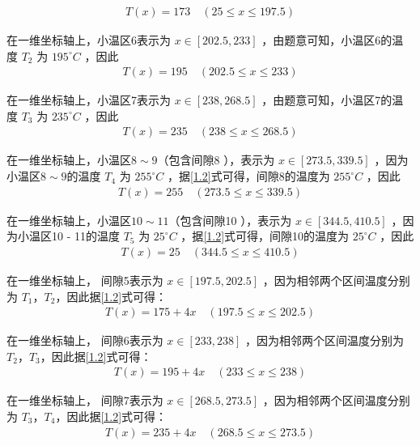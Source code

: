 \documentclass[../main.tex]{subfiles}
\begin{document}
\begin{align}\label{1.6}
T(x)=173\quad(25\leq x\leq197.5)
\end{align}
\par 在一维坐标轴上，小温区6表示为 \(x\in[202.5,233]\) ，由题意可知，小温区6的温度 \(T_{2}\) 为 \(195^{\circ}C\) ，因此
\begin{align}\label{1.7}
  T(x)=195\quad(202.5\leq x\leq233)
    \end{align}
    \par 在一维坐标轴上，小温区7表示为 \(x\in[238,268.5]\) ，由题意可知，小温区7的温度 \(T_{3}\) 为 \(235^{\circ}C\) ，因此
\begin{align}\label{1.8}
  T(x)=235\quad(238\leq x\leq268.5)
    \end{align}
\par 在一维坐标轴上，小温区$8\sim9$（包含间隙8 ），表示为 \(x\in[273.5,339.5]\) ，因为小温区$8\sim9$的温度 \(T_{4}\) 为 \(255^{\circ}C\) ，据\eqref{1.2}式可得，间隙8的温度为 \(255^{\circ}C\) ，因此
\begin{align}\label{1.9}
T(x)=255\quad(273.5\leq x\leq339.5)
    \end{align}
\par 在一维坐标轴上，小温区$10\sim11$（包含间隙10 ），表示为 \(x\in[344.5,410.5]\) ，因为小温区10 - 11的温度 \(T_{5}\) 为 \(25^{\circ}C\) ，据\eqref{1.2}式可得，间隙10的温度为 \(25^{\circ}C\) ，因此
\begin{align}\label{1.10}
    T(x)=25\quad(344.5\leq x\leq410.5)
    \end{align}
\par 在一维坐标轴上， 间隙5表示为 \(x\in[197.5,202.5]\) ，因为相邻两个区间温度分别为 \(T_1\)，\(T_2\)，因此据\eqref{1.2}式可得：
\begin{align}\label{1.11}
   T(x)=175 + 4x\quad(197.5\leq x\leq202.5)
    \end{align}
    \par 在一维坐标轴上， 间隙6表示为 \(x\in[233,238]\) ，因为相邻两个区间温度分别为 \(T_2\)，\(T_3\)，因此据\eqref{1.2}式可得：
    \begin{align}\label{1.12}
       T(x)=195 + 4x\quad(233\leq x\leq238)
        \end{align}
\par 在一维坐标轴上， 间隙7表示为 \(x\in[268.5,273.5]\) ，因为相邻两个区间温度分别为 \(T_3\)，\(T_4\)，因此据\eqref{1.2}式可得：
        \begin{align}\label{1.13}
           T(x)=235 + 4x\quad(268.5\leq x\leq273.5)
            \end{align}
\end{document}
